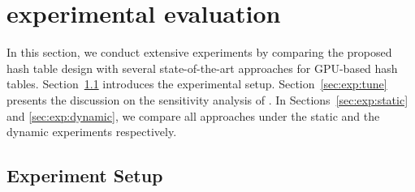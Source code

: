 \section{experimental evaluation}\label{sec:exp}
In this section, we conduct extensive experiments by comparing the proposed hash table design \voter with several state-of-the-art approaches for GPU-based hash tables. 
Section~\ref{sec:exp:setup} introduces the experimental setup. 
Section~\ref{sec:exp:tune} presents the discussion on the sensitivity analysis of \voter.
In Sections~\ref{sec:exp:static} and \ref{sec:exp:dynamic}, we compare all approaches under the static and the dynamic experiments respectively.

\subsection{Experiment Setup}\label{sec:exp:setup}

